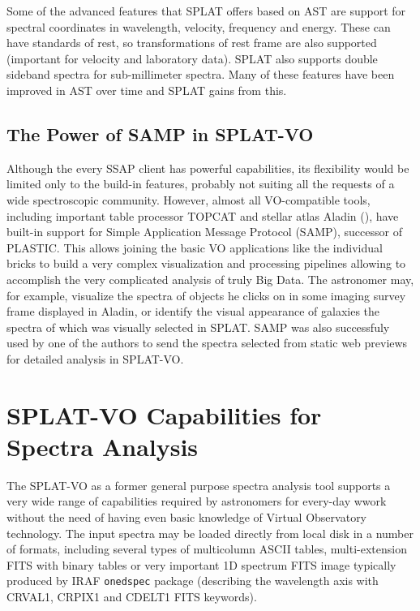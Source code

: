\documentclass[final,authoryear,5p,times,twocolumn]{elsarticle}
\begin{document}
Some of the advanced features that SPLAT offers based on AST are
support for spectral coordinates in wavelength, velocity, frequency
and energy. These can have standards of rest, so transformations of
rest frame are also supported (important for velocity and laboratory
data). SPLAT also supports double sideband spectra for sub-millimeter
spectra. Many of these features have been improved in AST over time
and SPLAT gains from this.


\subsection{The Power of SAMP in SPLAT-VO}

Although the every SSAP client has  powerful capabilities, its flexibility
would be limited only to the build-in features, probably not suiting all the
requests of a wide spectroscopic community. However, almost all VO-compatible
tools, including important table processor TOPCAT and stellar atlas
Aladin (),
have built-in support for Simple Application Message Protocol (SAMP), successor
of PLASTIC.  This allows joining the basic VO applications like the individual
bricks to build a very complex visualization and processing pipelines allowing
to accomplish the very complicated analysis of truly Big Data.  The astronomer
may, for example, visualize the spectra of objects he clicks on in some imaging
survey frame displayed in Aladin, or identify the visual appearance of galaxies
the spectra of which was visually selected in SPLAT.  SAMP was also successfuly
used by one of the authors to send the spectra selected from   static web
previews for detailed analysis in SPLAT-VO.


\section{SPLAT-VO Capabilities  for Spectra Analysis}

The SPLAT-VO as a former general purpose spectra analysis tool supports a very
wide range of capabilities required by astronomers for every-day wwork without
the need of having even basic knowledge of Virtual Observatory technology. The
input spectra may be loaded directly from local disk in a number of formats,
including several types of multicolumn ASCII tables, multi-extension FITS with
binary tables or very important 1D spectrum FITS image typically produced by
IRAF {\tt onedspec} package (describing the wavelength axis with CRVAL1, CRPIX1
and CDELT1 FITS keywords).
\end{document}
